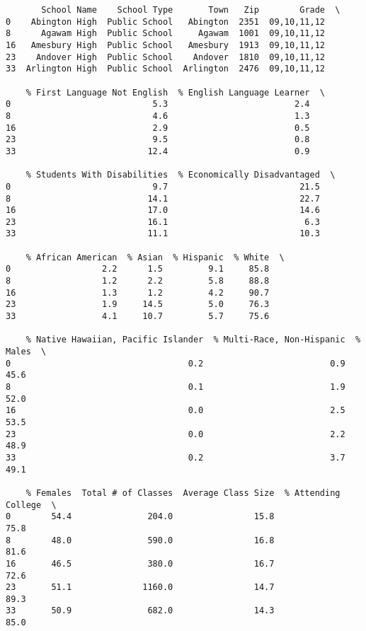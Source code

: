 \documentclass[11pt]{article}
\begin{document}
    
    \begin{verbatim}
       School Name    School Type       Town   Zip        Grade  \
0    Abington High  Public School   Abington  2351  09,10,11,12   
8      Agawam High  Public School     Agawam  1001  09,10,11,12   
16   Amesbury High  Public School   Amesbury  1913  09,10,11,12   
23    Andover High  Public School    Andover  1810  09,10,11,12   
33  Arlington High  Public School  Arlington  2476  09,10,11,12   

    % First Language Not English  % English Language Learner  \
0                            5.3                         2.4   
8                            4.6                         1.3   
16                           2.9                         0.5   
23                           9.5                         0.8   
33                          12.4                         0.9   

    % Students With Disabilities  % Economically Disadvantaged  \
0                            9.7                          21.5   
8                           14.1                          22.7   
16                          17.0                          14.6   
23                          16.1                           6.3   
33                          11.1                          10.3   

    % African American  % Asian  % Hispanic  % White  \
0                  2.2      1.5         9.1     85.8   
8                  1.2      2.2         5.8     88.8   
16                 1.3      1.2         4.2     90.7   
23                 1.9     14.5         5.0     76.3   
33                 4.1     10.7         5.7     75.6   

    % Native Hawaiian, Pacific Islander  % Multi-Race, Non-Hispanic  % Males  \
0                                   0.2                         0.9     45.6   
8                                   0.1                         1.9     52.0   
16                                  0.0                         2.5     53.5   
23                                  0.0                         2.2     48.9   
33                                  0.2                         3.7     49.1   

    % Females  Total # of Classes  Average Class Size  % Attending College  \
0        54.4               204.0                15.8                 75.8   
8        48.0               590.0                16.8                 81.6   
16       46.5               380.0                16.7                 72.6   
23       51.1              1160.0                14.7                 89.3   
33       50.9               682.0                14.3                 85.0   


\end{verbatim}
\end{document}
